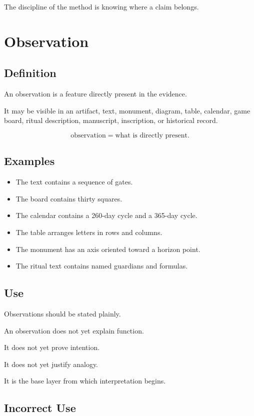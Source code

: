 \documentclass[11pt]{book}
\begin{document}
The discipline of the method is knowing where a claim belongs.

\section{Observation}

\subsection{Definition}

An observation is a feature directly present in the evidence.

It may be visible in an artifact, text, monument, diagram, table, calendar, game board, ritual description, manuscript, inscription, or historical record.

\[
\text{observation} = \text{what is directly present}.
\]

\subsection{Examples}

\begin{itemize}
    \item The text contains a sequence of gates.
    \item The board contains thirty squares.
    \item The calendar contains a 260-day cycle and a 365-day cycle.
    \item The table arranges letters in rows and columns.
    \item The monument has an axis oriented toward a horizon point.
    \item The ritual text contains named guardians and formulas.
\end{itemize}

\subsection{Use}

Observations should be stated plainly.

An observation does not yet explain function.

It does not yet prove intention.

It does not yet justify analogy.

It is the base layer from which interpretation begins.

\subsection{Incorrect Use}
\end{document}
